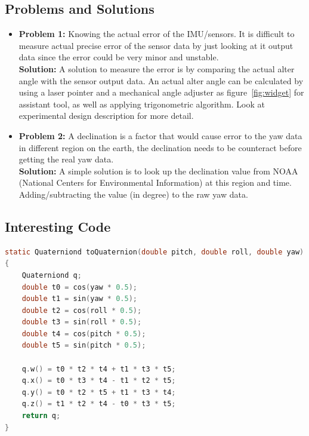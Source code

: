 \subsection{Problems and Solutions}
\begin{itemize}
	\item \textbf{Problem 1:}
	Knowing the actual error of the IMU/sensors. It is difficult to measure actual precise error of the sensor data by just looking at it output data since the error could be very minor and unstable.\\

	\textbf{Solution:}
	A solution to measure the error is by comparing the actual alter angle with the sensor output data. An actual alter angle can be calculated by using a laser pointer and a mechanical angle adjuster as figure~\ref{fig:widget} for assistant tool, as well as applying trigonometric algorithm. Look at experimental design description for more detail.\\

	\item \textbf{Problem 2:}
	A declination is a factor that would cause error to the yaw data in different region on the earth, the declination needs to be counteract before getting the real yaw data.\\

	\textbf{Solution:}
	A simple solution is to look up the declination value from NOAA (National Centers for Environmental Information) at this region and time. Adding/subtracting the value (in degree) to the raw yaw data.

\end{itemize}



\subsection{Interesting Code}
\begin{lstlisting}[language=c]
static Quaterniond toQuaternion(double pitch, double roll, double yaw)
{
	Quaterniond q;
	double t0 = cos(yaw * 0.5);
	double t1 = sin(yaw * 0.5);
	double t2 = cos(roll * 0.5);
	double t3 = sin(roll * 0.5);
	double t4 = cos(pitch * 0.5);
	double t5 = sin(pitch * 0.5);

	q.w() = t0 * t2 * t4 + t1 * t3 * t5;
	q.x() = t0 * t3 * t4 - t1 * t2 * t5;
	q.y() = t0 * t2 * t5 + t1 * t3 * t4;
	q.z() = t1 * t2 * t4 - t0 * t3 * t5;
	return q;
}
\end{lstlisting}

